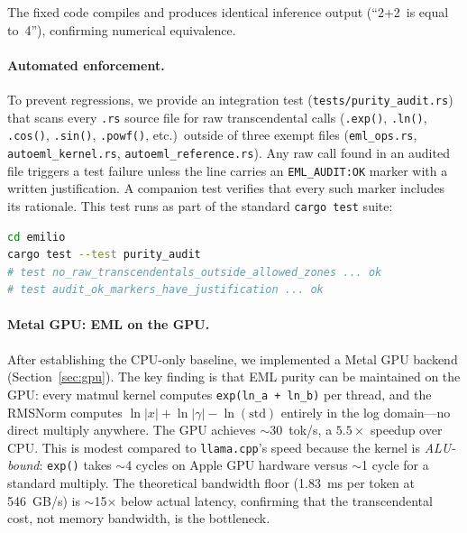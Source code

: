 \documentclass[acmsmall,nonacm]{acmart}
\begin{document}
The fixed code compiles and produces identical inference output
(``2+2~is equal to~4''), confirming numerical equivalence.

\paragraph{Automated enforcement.}
To prevent regressions, we provide an integration test
(\texttt{tests/purity\_audit.rs}) that scans every \texttt{.rs} source
file for raw transcendental calls (\texttt{.exp()}, \texttt{.ln()},
\texttt{.cos()}, \texttt{.sin()}, \texttt{.powf()}, etc.)\ outside of
three exempt files (\texttt{eml\_ops.rs}, \texttt{autoeml\_kernel.rs},
\texttt{autoeml\_reference.rs}).  Any raw call found in an audited file
triggers a test failure unless the line carries an
\texttt{EML\_AUDIT:OK} marker with a written justification.  A
companion test verifies that every such marker includes its rationale.
This test runs as part of the standard \texttt{cargo test} suite:

\begin{lstlisting}[language=bash,caption={Running the purity audit.}]
cd emilio
cargo test --test purity_audit
# test no_raw_transcendentals_outside_allowed_zones ... ok
# test audit_ok_markers_have_justification ... ok
\end{lstlisting}

\paragraph{Metal GPU: EML on the GPU.}
After establishing the CPU-only baseline, we implemented a Metal GPU
backend (Section~\ref{sec:gpu}).  The key finding is that EML purity
can be maintained on the GPU: every matmul kernel computes
\texttt{exp(ln\_a + ln\_b)} per thread, and the RMSNorm computes
$\ln|x| + \ln|\gamma| - \ln(\mathrm{std})$ entirely in the log
domain---no direct multiply anywhere.  The GPU achieves
$\sim$30~tok/s, a $5.5\times$ speedup over CPU.  This is modest
compared to \texttt{llama.cpp}'s speed because the kernel is
\emph{ALU-bound}: \texttt{exp()} takes $\sim$4 cycles on Apple GPU
hardware versus $\sim$1 cycle for a standard multiply.  The theoretical
bandwidth floor (1.83~ms per token at 546~GB/s) is $\sim$15$\times$
below actual latency, confirming that the transcendental cost, not
memory bandwidth, is the bottleneck.
\end{document}

